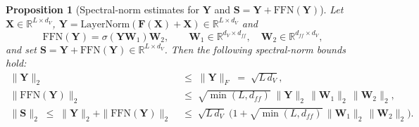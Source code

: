 \documentclass{article}
\newtheorem{proposition}{Proposition}
\begin{document}
\begin{proposition}[Spectral-norm estimates for $\mathbf{Y}$ and $\mathbf{S}=\mathbf{Y}+\mathrm{FFN}(\mathbf{Y})$]\label{prop:Y_S_norm_bounds}
Let $\mathbf{X}\in\mathbb{R}^{L\times d_V}$, $\mathbf{Y}=\mathrm{LayerNorm}(\mathbf{F}(\mathbf{X})+\mathbf{X})\in\mathbb{R}^{L\times d_V}$ and
\[\mathrm{FFN}(\mathbf{Y})=\sigma(\mathbf{Y}\mathbf{W}_1)\mathbf{W}_2,\qquad\mathbf{W}_1\in\mathbb{R}^{d_V\times d_{ff}},\quad\mathbf{W}_2\in\mathbb{R}^{d_{ff}\times d_V},\]
and set $\mathbf{S}=\mathbf{Y}+\mathrm{FFN}(\mathbf{Y})\in\mathbb{R}^{L\times d_V}$.
Then the following spectral-norm bounds hold:
\begin{align}
\|\mathbf{Y}\|_2 &\;\le\; \|\mathbf{Y}\|_F \;=\; \sqrt{L\,d_V}, 
\label{eq:Y_norm_bound}
\\
\|\mathrm{FFN}(\mathbf{Y})\|_2 &\;\le\; \sqrt{\min(L,d_{ff})}\; \|\mathbf{Y}\|_2\,\|\mathbf{W}_1\|_2\,\|\mathbf{W}_2\|_2,
\label{eq:FFN_norm_bound}
\\
\|\mathbf{S}\|_2 \;\le\; \|\mathbf{Y}\|_2 + \|\mathrm{FFN}(\mathbf{Y})\|_2 
&\;\le\; \sqrt{L\,d_V}\;\Big(1+\sqrt{\min(L,d_{ff})}\,\|\mathbf{W}_1\|_2\,\|\mathbf{W}_2\|_2\Big).
\label{eq:S_norm_bound}
\end{align}
\end{proposition}
\end{document}
